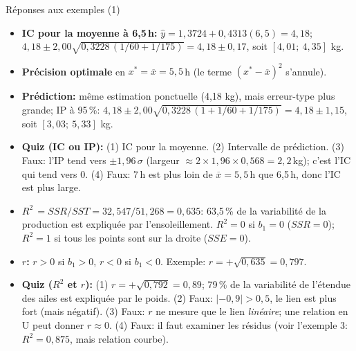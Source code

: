 \documentclass{BeamerTemplate}
\begin{document}
\begin{frame}[t]{Réponses aux exemples (1)}

\scriptsize
\begin{itemize}\itemsep1mm
  \item \textbf{IC pour la moyenne à 6,5\,h:} $\hat y=1{,}3724+0{,}4313(6{,}5)=4{,}18$;
  $4{,}18\pm2{,}00\sqrt{0{,}3228\,(1/60+1/175)}=4{,}18\pm0{,}17$, soit $[4{,}01;\ 4{,}35]$ kg.
  \item \textbf{Précision optimale} en $x^*=\overline{x}=5{,}5$\,h (le terme
  $(x^*-\overline{x})^2$ s'annule).
  \item \textbf{Prédiction:} même estimation ponctuelle (4,18 kg), mais erreur-type plus
  grande; IP à 95\,\%: $4{,}18\pm2{,}00\sqrt{0{,}3228\,(1+1/60+1/175)}=4{,}18\pm1{,}15$,
  soit $[3{,}03;\ 5{,}33]$ kg.
  \item \textbf{Quiz (IC ou IP):} (1) IC pour la moyenne. (2) Intervalle de
  prédiction. (3) Faux: l'IP tend vers $\pm1{,}96\,\sigma$ (largeur
  $\approx2\times1{,}96\times0{,}568=2{,}2$\,kg); c'est l'IC qui tend vers 0.
  (4) Faux: 7\,h est plus loin de $\overline{x}=5{,}5$\,h que 6,5\,h, donc l'IC est
  plus large.
  \item \textbf{$R^2$}$\,=SSR/SST=32{,}547/51{,}268=0{,}635$: 63,5\,\% de la variabilité
  de la production est expliquée par l'ensoleillement. $R^2=0$ si $b_1=0$ ($SSR=0$);
  $R^2=1$ si tous les points sont sur la droite ($SSE=0$).
  \item \textbf{$r$:} $r>0$ si $b_1>0$, $r<0$ si $b_1<0$. Exemple:
  $r=+\sqrt{0{,}635}=0{,}797$.
  \item \textbf{Quiz ($R^2$ et $r$):} (1) $r=+\sqrt{0{,}792}=0{,}89$; 79\,\% de la
  variabilité de l'étendue des ailes est expliquée par le poids. (2) Faux:
  $|-0{,}9|>0{,}5$, le lien est plus fort (mais négatif). (3) Faux: $r$ ne mesure que
  le lien \emph{linéaire}; une relation en U peut donner $r\approx0$. (4) Faux: il
  faut examiner les résidus (voir l'exemple 3: $R^2=0{,}875$, mais relation courbe).
\end{itemize}

\end{frame}
\end{document}
